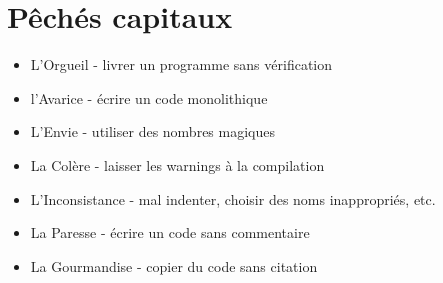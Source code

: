 \section{Pêchés capitaux}
\begin{itemize}
   \item L'Orgueil - livrer un programme sans vérification
   \item l'Avarice - écrire un code monolithique
   \item L'Envie - utiliser des nombres magiques
   \item La Colère - laisser les warnings à la compilation
   \item L'Inconsistance - mal indenter, choisir des noms inappropriés, etc.
   \item La Paresse - écrire un code sans commentaire
   \item La Gourmandise - copier du code sans citation
\end{itemize}


